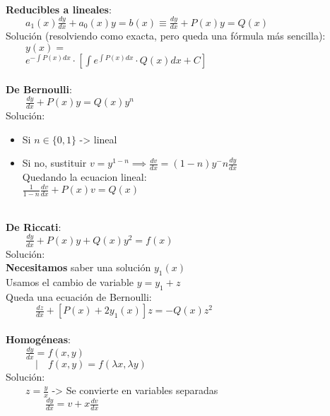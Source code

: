 \documentclass[a4paper,landscape,10pt]{cheatsheet}
\begin{document}
\hfill\\
\textbf{Reducibles a lineales}:\\
$\qquad a_1(x)\frac{dy}{dx}+a_0(x)y=b(x) \equiv \frac{dy}{dx}+P(x)y=Q(x)$\\
Solución (resolviendo como exacta, pero queda una fórmula más sencilla):\\
$\qquad y(x)=$\\
$\qquad e^{-\int P(x)dx}\cdot\left[\int e^{\int P(x)dx}\cdot Q(x)dx + C\right]$\\

\hfill\\
\textbf{De Bernoulli}:\\
$\qquad \frac{dy}{dx}+P(x)y=Q(x)y^n$\\
Solución:\\
\begin{itemize}
  \item Si $n\in\{0,1\}$ -> lineal\\
  \item Si no, sustituir $v=y^{1-n} \implies \frac{dv}{dx}=(1-n)y^-n\frac{dy}{dx}$
        \\ Quedando la ecuacion lineal:
        \\$\frac{1}{1-n}\frac{dv}{dx}+P(x)v=Q(x)$
\end{itemize}

\hfill\\
\textbf{De Riccati}:\\
$\qquad \frac{dy}{dx}+P(x)y+Q(x)y^2=f(x)$\\
Solución:\\
\qquad\textbf{Necesitamos} saber una solución $y_1(x)$\\
\qquad Usamos el cambio de variable $y=y_1+z$\\
\qquad Queda una ecuación de Bernoulli: \\
$\qquad\quad \frac{dz}{dx}+\left[P(x)+2y_1(x)\right]z=-Q(x)z^2$\\

\hfill\\
\textbf{Homogéneas}:\\
$\qquad \frac{dy}{dx}=f(x,y)$\\
$\qquad\quad | \quad f(x,y)=f(\lambda x, \lambda y)$\\
Solución:\\
$\qquad z=\frac{y}{x}$ -> Se convierte en variables separadas\\
$\qquad\qquad \frac{dy}{dx}=v+x\frac{dv}{dx}$
\end{document}
